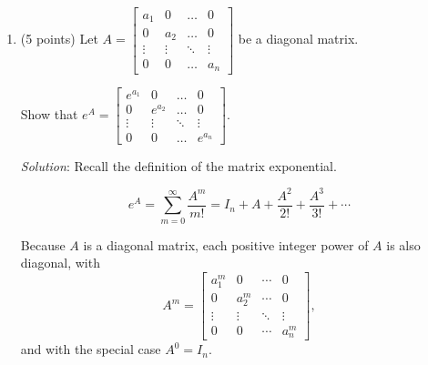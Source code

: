 \documentclass{article}
\begin{document}
\begin{enumerate}
        Left-multiplying each element of \eqref{eq:e_to_D} by $P$, we obtain:
        \begin{equation}
          Pe^D = PI_n + PD + \frac{PD^2}{2!} + \frac{PD^3}{3!} + \cdots \label{eq:e_to_D_left_multiplied_by_P}
        \end{equation}

        Subsequently right-multiplying each element of \eqref{eq:e_to_D_left_multiplied_by_P} by $P^{-1}$, we obtain:
        \begin{equation}
          Pe^DP^{-1} = PI_nP^{-1} + PDP^{-1} + \frac{PD^2P^{-1}}{2!} + \frac{PD^3P^{-1}}{3!} + \cdots \label{eq:e_to_D_left_multiplied_by_P_right_multiplied_by_P_inverse}
        \end{equation}

        But the right-hand side of \eqref{eq:e_to_D_left_multiplied_by_P_right_multiplied_by_P_inverse} is equal to the right-hand side of \eqref{eq:expanded_e_to_A}. Therefore,
        \[
          \boxed{e^A
            =Pe^DP^{-1}}
        \]
        which was what we wanted.
        \medskip

  \item (5 points) Let $A = \begin{bmatrix}
            a_1    & 0      & \ldots & 0      \\
            0      & a_2    & \ldots & 0      \\
            \vdots & \vdots & \ddots & \vdots \\
            0      & 0      & \ldots & a_n
          \end{bmatrix}$ be a diagonal matrix.

        Show that $e^A = \begin{bmatrix}
            e^{a_1} & 0       & \ldots & 0       \\
            0       & e^{a_2} & \ldots & 0       \\
            \vdots  & \vdots  & \ddots & \vdots  \\
            0       & 0       & \ldots & e^{a_n}
          \end{bmatrix}$.

        \emph{Solution}: Recall the definition of the matrix exponential.

        \[
          e^A=\sum_{m=0}^{\infty}\frac{A^m}{m!}
          =I_n+A+\frac{A^2}{2!}+\frac{A^3}{3!}+\cdots
        \]

        Because $A$ is a diagonal matrix, each positive integer
        power of $A$ is also diagonal, with
        \[
          A^m =
          \begin{bmatrix}
            a_1^m  & 0      & \cdots & 0      \\
            0      & a_2^m  & \cdots & 0      \\
            \vdots & \vdots & \ddots & \vdots \\
            0      & 0      & \cdots & a_n^m
          \end{bmatrix},
        \]
        and with the special case $A^0=I_n$.


\end{enumerate}
\end{document}
